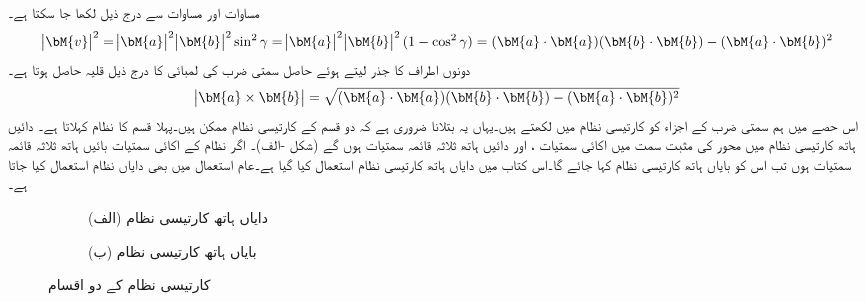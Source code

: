 مساوات  اور مساوات  سے درج ذیل لکھا جا سکتا ہے۔
\begin{align*}
\abs{\bM{v}}^2=\abs{\bM{a}}^2\abs{\bM{b}}^2\sin^2\gamma=\abs{\bM{a}}^2\abs{\bM{b}}^2(1-\cos^2\gamma)=(\bM{a}\cdot\bM{a})(\bM{b}\cdot\bM{b})-(\bM{a}\cdot\bM{b})^2
\end{align*}
دونوں اطراف کا جذر لیتے ہوئے حاصل سمتی ضرب کی لمبائی کا درج ذیل قلیہ حاصل ہوتا ہے۔
\begin{align}\label{مساوات_الجبرا_سمتی_ضرب_معیار_کی_اہم_مساوات}
\abs{\bM{a}\times \bM{b}}=\sqrt{(\bM{a}\cdot\bM{a})(\bM{b}\cdot\bM{b})-(\bM{a}\cdot\bM{b})^2}
\end{align}
اس حصے میں ہم سمتی ضرب کے اجزاء کو کارتیسی نظام میں لکھتے ہیں۔یہاں یہ بتلانا ضروری ہے کہ دو قسم کے کارتیسی نظام ممکن ہیں۔پہلا قسم   کا نظام کہلاتا ہے۔ دائیں ہاتھ کارتیسی نظام میں محور کی مثبت سمت میں اکائی سمتیات ،  اور  دائیں ہاتھ ثلاثہ قائمہ سمتیات ہوں گے (شکل -الف)۔ اگر نظام کے اکائی سمتیات بائیں ہاتھ ثلاثہ قائمہ سمتیات ہوں تب اس کو بایاں ہاتھ کارتیسی نظام کہا جائے گا۔اس کتاب میں دایاں ہاتھ کارتیسی نظام استعمال کیا گیا ہے۔عام استعمال میں بھی دایاں نظام استعمال کیا جاتا ہے۔ 
\begin{figure}
\centering
\begin{subfigure}{0.5\textwidth}
\centering
{}
\caption*{(الف) دایاں ہاتھ کارتیسی نظام}
\end{subfigure}%
\begin{subfigure}{0.5\textwidth}
\centering
{}
\caption*{(ب) بایاں ہاتھ کارتیسی نظام}
\end{subfigure}%
\caption{کارتیسی نظام کے دو اقسام}
\label{شکل_الجبرا_کارتیسی_بایاں_دایاں_نظام}
\end{figure}

